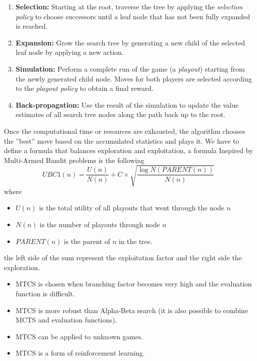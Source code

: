 \documentclass[10pt, letterpaper]{report}
\begin{document}
\begin{enumerate}
    \item \textbf{Selection:} Starting at the root, traverse the tree by applying the \textit{selection policy} to choose successors until a leaf node that has not been fully expanded is reached.
    \item \textbf{Expansion:} Grow the search tree by generating a new child of the selected leaf node by applying a new action.
    \item \textbf{Simulation:} Perform a complete run of the game (a \textit{playout}) starting from the newly generated child node. Moves for both players are selected according to the \textit{playout policy} to obtain a final reward.
    \item \textbf{Back-propagation:} Use the result of the simulation to update the value estimates of all search tree nodes along the path back up to the root.
\end{enumerate}
Once the computational time or resources are exhausted, the algorithm chooses the ''best'' move based on the accumulated statistics and plays it.
We have to define a formula that balances exploration and exploitation, a formula  Inspired by Multi-Armed
 Bandit problems is the following\begin{equation}
    UBC1(n)=\frac{U(n)}{N(n)}+C\times\sqrt{\frac{\log N(PARENT(n))}{N(n)}}
 \end{equation}
where\begin{itemize}
    \item $U(n)$ is the total utility of all playouts that went through the node $n$
    \item $N(n)$ is the number of playouts through node $n$ 
    \item $PARENT(n)$ is the parent of $n$ in the tree. 
\end{itemize}
the left side of the sum represent the exploitation factor and the right side the exploration.
\begin{itemize}
    \item MTCS is chosen when branching factor becomes very high and the
     evaluation function is difficult.
     \item  MTCS is more robust than Alpha-Beta search (it is also possible to
 combine MCTS and evaluation functions).
 \item MTCS can be applied to unknown games. 
 \item  MTCS is a form of reinforcement learning.
\end{itemize}
\end{document}
